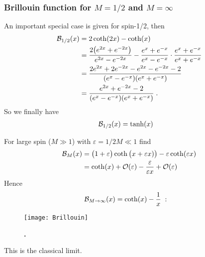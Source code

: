 \subsubsection{Brillouin function for $M=1/2$ and $M=\infty$}
An important special case is given for spin-1/2, then
%
\begin{align*}
{\cal B}_{1/2}(x) &= 2 \coth(2 x) - \coth(x)\\
&=\frac{2\big( e^{2x}+e^{-2x} \big)}{e^{2x}-e^{-2x}}
-\frac{ e^{x}+e^{-x} }{e^{x}-e^{-x}}\cdot
\frac{ e^{x}+e^{-x} }{e^{x}+e^{-x}}\\
&=\frac{2 e^{2x}+2e^{-2x} -e^{2x}-e^{-2x}-2}{(e^{x}-e^{-x})(e^{x}+e^{-x})}\\
&=\frac{e^{2x}+e^{-2x} -2}{(e^{x}-e^{-x})(e^{x}+e^{-x})}\;.
\end{align*}
%
So we finally have
%
\begin{align}\label{eq:brillouin:spin:12}
{\cal B}_{1/2}(x) &= \tanh(x)
\end{align}


For large  spin ($M\gg 1$) with $\varepsilon=1/2M\ll 1$ find 
%
\begin{align*}
{\cal B}_{M}(x) &= \big( 1+\varepsilon \big)\coth\big( x+\varepsilon x)\big) - \varepsilon \coth(\varepsilon x)\\
&= \coth(x) +{\cal O}(\varepsilon) -\frac{\varepsilon}{\varepsilon x} +{\cal O}(\varepsilon)
\end{align*}
%
Hence 
%
\begin{subequations}\label{eq:}
\begin{align}
{\cal B}_{M\to \infty}(x) &= \coth(x) -\frac{1}{x}\;:
\end{align}
\end{subequations}

\begin{figure}[ht]
\begin{center}
\texttt{[image: Brillouin]}
\caption{{\bf .}}
\end{center}
\end{figure}

%
This is the classical limit. 
%
